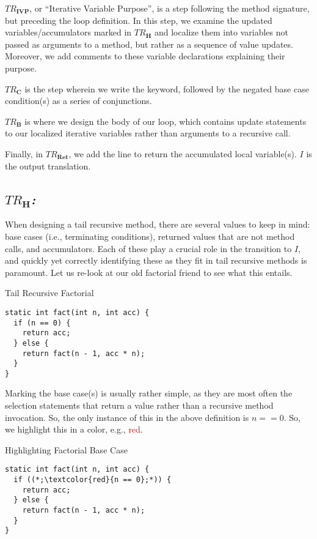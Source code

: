 \textit{$TR_\mathbf{IVP}$}, or ``Iterative Variable Purpose'', is a step following the method signature, but preceding the loop definition. In this step, we examine the updated variables/accumulators marked in \textit{$TR_\mathbf{H}$} and localize them into variables not passed as arguments to a method, but rather as a sequence of value updates. Moreover, we add comments to these variable declarations explaining their purpose.

\textit{$TR_\mathbf{C}$} is the step wherein we write the  keyword, followed by the negated base case condition(s) as a series of conjunctions.

\textit{$TR_\mathbf{B}$} is where we design the body of our loop, which contains update statements to our localized iterative variables rather than arguments to a recursive call.

Finally, in \textit{$TR_\mathbf{Ret}$}, we add the line to return the accumulated local variable(s). $I$ is the output translation.

\subsection*{\textit{$TR_\mathbf{H}$:}} When designing a tail recursive method, there are several values to keep in mind: base cases (i.e., terminating conditions), returned values that are not method calls, and accumulators. Each of these play a crucial role in the transition to $I$, and quickly yet correctly identifying these as they fit in tail recursive methods is paramount. Let us re-look at our old factorial friend to see what this entails.

\begin{cl}[]{Tail Recursive Factorial}
\begin{lstlisting}[language=MyJava]
static int fact(int n, int acc) {
  if (n == 0) {
    return acc;
  } else {
    return fact(n - 1, acc * n);
  }
}
\end{lstlisting}
\end{cl}

Marking the base case(s) is usually rather simple, as they are most often the selection statements that return a value rather than a recursive method invocation. So, the only instance of this in the above definition is $n == 0$. So, we highlight this in a color, e.g., \textcolor{red}{red}.

\begin{cl}[]{Highlighting Factorial Base Case}
\begin{lstlisting}[language=MyJava]
static int fact(int n, int acc) {
  if ((*;\textcolor{red}{n == 0};*)) {
    return acc;
  } else {
    return fact(n - 1, acc * n);
  }
}
\end{lstlisting}
\end{cl}

